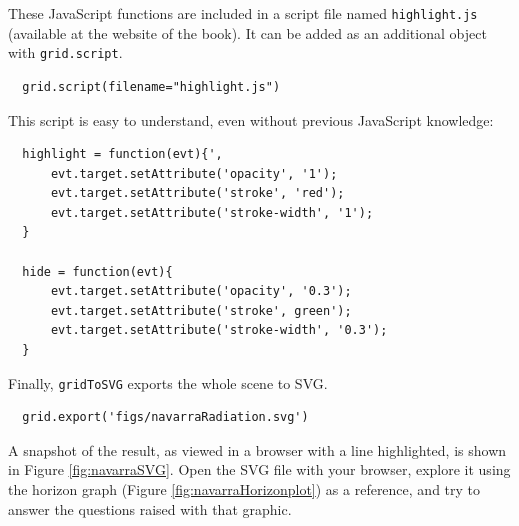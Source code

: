 \documentclass[smallroyalvopaper]{memoir}
\begin{document}
These JavaScript functions are included in a script file named
\texttt{highlight.js} (available at the website of the book). It can be
added as an additional object with \texttt{grid.script}.


\lstset{language=r,label= ,caption= ,captionpos=b,numbers=none}
\begin{lstlisting}
  grid.script(filename="highlight.js")
\end{lstlisting}

This script is easy to understand, even without previous
JavaScript knowledge:
\begin{verbatim}
  highlight = function(evt){',
      evt.target.setAttribute('opacity', '1');
      evt.target.setAttribute('stroke', 'red');
      evt.target.setAttribute('stroke-width', '1');
  }
  
  hide = function(evt){
      evt.target.setAttribute('opacity', '0.3');
      evt.target.setAttribute('stroke', green');
      evt.target.setAttribute('stroke-width', '0.3');
  }
\end{verbatim}

Finally, \texttt{gridToSVG} exports the whole scene to SVG. 

\lstset{language=r,label= ,caption= ,captionpos=b,numbers=none}
\begin{lstlisting}
  grid.export('figs/navarraRadiation.svg')
\end{lstlisting}

A snapshot of the result, as viewed in a browser with a line
highlighted, is shown in Figure \ref{fig:navarraSVG}. Open the SVG
file with your browser, explore it using the horizon graph (Figure
\ref{fig:navarraHorizonplot}) as a reference, and try to answer the
questions raised with that graphic.
\end{document}
